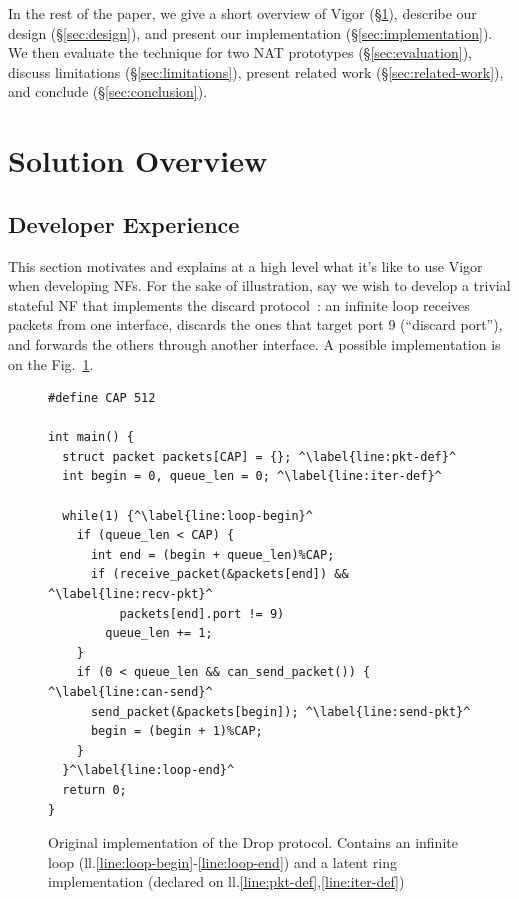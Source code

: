 \documentclass[letterpaper,twocolumn,10pt]{article}
\begin{document}
In the rest of the paper, we give a short overview of Vigor
(\S\ref{sec:solution-overview}), describe our design (\S\ref{sec:design}), and
present our implementation (\S\ref{sec:implementation}). We then evaluate the
technique for two NAT prototypes (\S\ref{sec:evaluation}), discuss limitations
(\S\ref{sec:limitations}), present related work (\S\ref{sec:related-work}), and
conclude (\S\ref{sec:conclusion}).


\section{Solution Overview}
\label{sec:solution-overview}

\subsection{Developer Experience}

This section motivates and explains at a high level what it's like to use Vigor
when developing NFs. For the sake of illustration, say we wish to develop a
trivial stateful NF that implements the discard protocol~\cite{rfc863}: an
infinite loop receives packets from one interface, discards the ones that target
port 9 (``discard port''), and forwards the others through another interface.
A possible implementation is on the Fig.~\ref{lst:orig}.

\begin{figure}[h!]
\begin{lstlisting}
#define CAP 512

int main() {
  struct packet packets[CAP] = {}; ^\label{line:pkt-def}^
  int begin = 0, queue_len = 0; ^\label{line:iter-def}^

  while(1) {^\label{line:loop-begin}^
    if (queue_len < CAP) {
      int end = (begin + queue_len)%CAP;
      if (receive_packet(&packets[end]) && ^\label{line:recv-pkt}^
          packets[end].port != 9)
        queue_len += 1;
    }
    if (0 < queue_len && can_send_packet()) { ^\label{line:can-send}^
      send_packet(&packets[begin]); ^\label{line:send-pkt}^
      begin = (begin + 1)%CAP;
    }
  }^\label{line:loop-end}^
  return 0;
}
\end{lstlisting}
  \caption{Original implementation of the Drop protocol. Contains an infinite
    loop (ll.\ref{line:loop-begin}-\ref{line:loop-end}) and a latent ring
    implementation (declared on ll.\ref{line:pkt-def},\ref{line:iter-def})}
  \label{lst:orig}
\end{figure}
\end{document}
